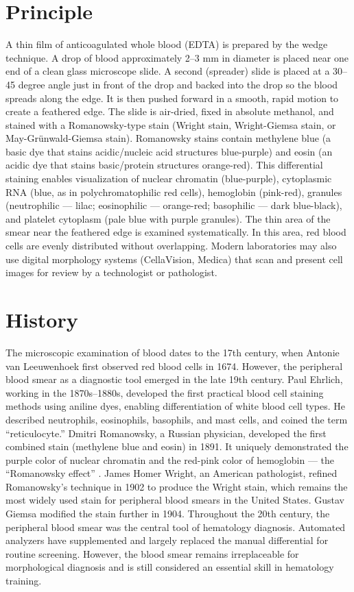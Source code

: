 \section*{Principle}
A thin film of anticoagulated whole blood (EDTA) is prepared by the wedge technique. A drop of blood approximately 2--3 mm in diameter is placed near one end of a clean glass microscope slide. A second (spreader) slide is placed at a 30--45 degree angle just in front of the drop and backed into the drop so the blood spreads along the edge. It is then pushed forward in a smooth, rapid motion to create a feathered edge. The slide is air-dried, fixed in absolute methanol, and stained with a Romanowsky-type stain (Wright stain, Wright-Giemsa stain, or May-Gr\"{u}nwald-Giemsa stain). Romanowsky stains contain methylene blue (a basic dye that stains acidic/nucleic acid structures blue-purple) and eosin (an acidic dye that stains basic/protein structures orange-red). This differential staining enables visualization of nuclear chromatin (blue-purple), cytoplasmic RNA (blue, as in polychromatophilic red cells), hemoglobin (pink-red), granules (neutrophilic --- lilac; eosinophilic --- orange-red; basophilic --- dark blue-black), and platelet cytoplasm (pale blue with purple granules). The thin area of the smear near the feathered edge is examined systematically. In this area, red blood cells are evenly distributed without overlapping. Modern laboratories may also use digital morphology systems (CellaVision, Medica) that scan and present cell images for review by a technologist or pathologist.

\section*{History}
The microscopic examination of blood dates to the 17th century, when Antonie van Leeuwenhoek first observed red blood cells in 1674. However, the peripheral blood smear as a diagnostic tool emerged in the late 19th century. Paul Ehrlich, working in the 1870s--1880s, developed the first practical blood cell staining methods using aniline dyes, enabling differentiation of white blood cell types. He described neutrophils, eosinophils, basophils, and mast cells, and coined the term ``reticulocyte.'' Dmitri Romanowsky, a Russian physician, developed the first combined stain (methylene blue and eosin) in 1891. It uniquely demonstrated the purple color of nuclear chromatin and the red-pink color of hemoglobin --- the ``Romanowsky effect'' \cite{wittekind1979romanowsky}. James Homer Wright, an American pathologist, refined Romanowsky's technique in 1902 to produce the Wright stain, which remains the most widely used stain for peripheral blood smears in the United States. Gustav Giemsa modified the stain further in 1904. Throughout the 20th century, the peripheral blood smear was the central tool of hematology diagnosis. Automated analyzers have supplemented and largely replaced the manual differential for routine screening. However, the blood smear remains irreplaceable for morphological diagnosis and is still considered an essential skill in hematology training.

